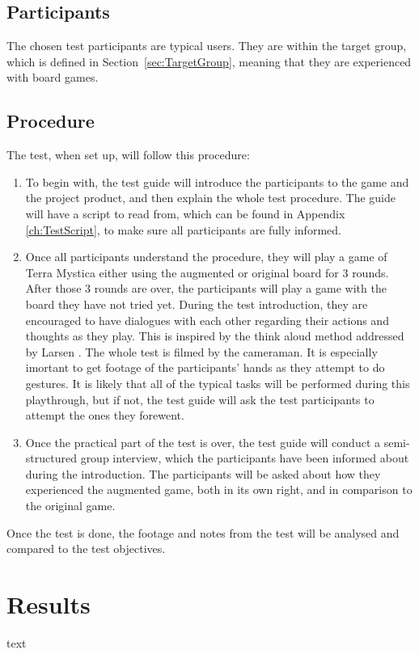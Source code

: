 \subsection{Participants}
The chosen test participants are typical users. They are within the target group, which is defined in Section~\ref{sec:TargetGroup}, meaning that they are experienced with board games. 

\subsection{Procedure}
The test, when set up, will follow this procedure: 

\begin{enumerate}
\item To begin with, the test guide will introduce the participants to the game and the project product, and then explain the whole test procedure. The guide will have a script to read from, which can be found in Appendix \ref{ch:TestScript}, to make sure all participants are fully informed.
\item Once all participants understand the procedure, they will play a game of Terra Mystica either using the augmented or original board for 3 rounds. After those 3 rounds are over, the participants will play a game with the board they have not tried yet. During the test introduction, they are encouraged to have dialogues with each other regarding their actions and thoughts as they play. This is inspired by the think aloud method addressed by Larsen \citep{TestingLecture}. The whole test is filmed by the cameraman. It is especially imortant to get footage of the participants' hands as they attempt to do gestures. It is likely that all of the typical tasks will be performed during this playthrough, but if not, the test guide will ask the test participants to attempt the ones they forewent.
\item Once the practical part of the test is over, the test guide will conduct a semi-structured group  interview, which the participants have been informed about during the introduction. The participants will be asked about how they experienced the augmented game, both in its own right, and in comparison to the original game.
\end{enumerate}

Once the test is done, the footage and notes from the test will be analysed and compared to the test objectives.

\section{Results}
text